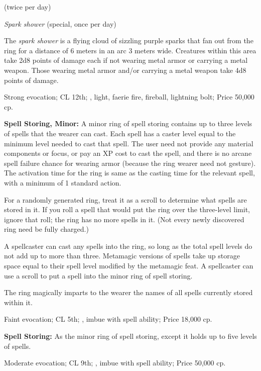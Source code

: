 \begin{itemize*}
\item {} (twice per day)
\item \emph{Spark shower} (special, once per day)
\begin{itemize*}

The \emph{spark shower} is a flying cloud of sizzling purple sparks that fan out from the ring for a distance of 6 meters in an arc 3 meters wide. Creatures within this area take 2d8 points of damage each if not wearing metal armor or carrying a metal weapon. Those wearing metal armor and/or carrying a metal weapon take 4d8 points of damage.

Strong evocation; CL 12th; , light, faerie fire, fireball, lightning bolt; Price 50,000 cp.

\textbf{Spell Storing, Minor:} A minor ring of spell storing contains up to three levels of spells that the wearer can cast. Each spell has a caster level equal to the minimum level needed to cast that spell. The user need not provide any material components or focus, or pay an XP cost to cast the spell, and there is no arcane spell failure chance for wearing armor (because the ring wearer need not gesture). The activation time for the ring is same as the casting time for the relevant spell, with a minimum of 1 standard action.

For a randomly generated ring, treat it as a scroll to determine what spells are stored in it. If you roll a spell that would put the ring over the three-level limit, ignore that roll; the ring has no more spells in it. (Not every newly discovered ring need be fully charged.)

A spellcaster can cast any spells into the ring, so long as the total spell levels do not add up to more than three. Metamagic versions of spells take up storage space equal to their spell level modified by the metamagic feat. A spellcaster can use a scroll to put a spell into the minor ring of spell storing.

The ring magically imparts to the wearer the names of all spells currently stored within it.

Faint evocation; CL 5th; , imbue with spell ability; Price 18,000 cp.

\textbf{Spell Storing:} As the minor ring of spell storing, except it holds up to five levels of spells.

Moderate evocation; CL 9th; , imbue with spell ability; Price 50,000 cp.


\end{itemize*}
\end{itemize*}
